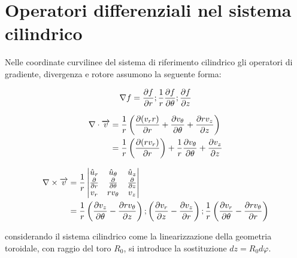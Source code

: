  \section{Operatori differenziali nel sistema cilindrico}

Nelle coordinate curvilinee del sistema di riferimento cilindrico gli
operatori di gradiente, divergenza e rotore assumono la seguente forma:

\begin{equation}
 \nabla f = \diffr{f} ; \frac1{r} \diff{\theta}{f} ; \diff{z}{f}
\end{equation}

\begin{align}
 \nabla \cdot \vettore{v} &= \frac1{r}\left( \diffr{(v_rr)} +
				      \diff{\theta}{v_\theta} +
 \diff{z}{rv_z} \right) \nonumber \\
&= \frac1{r}\left(\diffr{(rv_r)}\right) +
 \frac1{r}\diff{\theta}{v_\theta} + \diff{z}{v_z}
\end{align}

\begin{align}
 \nabla \times \vettore{v} &= \frac1{r} \left| 
 \begin{matrix}
  \hat u_r & \hat u_\theta & \hat u_z \\
  \diffr{} & \diff{\theta}{} & \diff{z}{} \\
  v_r & rv_\theta & v_z
 \end{matrix} \nonumber
\right| \\ &= \frac1{r}\left( \diff{\theta}{v_z} - \diff{z}{rv_\theta}
 \right) ; \left( \diff{z}{v_r} - \diffr{v_z}\right) ; \frac1{r}\left(
 \diff{\theta}{v_r} - \diffr{rv_\theta} \right)
\end{align}

considerando il sistema cilindrico come la linearizzazione della
geometria toroidale, con raggio del toro $R_0$, si introduce la
sostituzione $dz = R_0d\varphi$.
